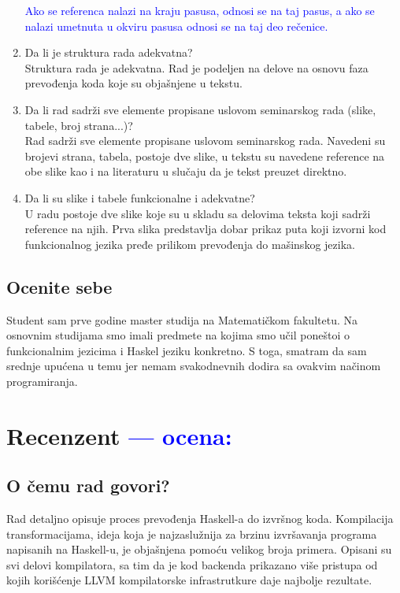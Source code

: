 \documentclass[a4paper]{report}
\newcommand{\odgovor}[1]{\textcolor{blue}{#1}}
\begin{document}
\begin{enumerate}
		\odgovor{Ako se referenca nalazi na kraju pasusa, odnosi se na taj pasus, a ako se nalazi umetnuta u okviru pasusa odnosi se na taj deo rečenice.}
		
		\item Da li je struktura rada adekvatna?\\
		Struktura rada je adekvatna. Rad je podeljen na delove na osnovu faza prevođenja koda koje su objašnjene u tekstu.
		\item Da li rad sadrži sve elemente propisane uslovom seminarskog rada (slike, tabele, broj strana...)?\\
		Rad sadrži sve elemente propisane uslovom seminarskog rada. Navedeni su brojevi strana, tabela, postoje dve slike, u tekstu su navedene reference na obe slike kao i na literaturu u slučaju da je tekst preuzet direktno.
		\item Da li su slike i tabele funkcionalne i adekvatne?\\
		U radu postoje dve slike koje su u skladu sa delovima teksta koji sadrži reference na njih. Prva slika predstavlja dobar prikaz puta koji izvorni kod funkcionalnog jezika pređe prilikom prevođenja do mašinskog jezika.
	\end{enumerate}
	
	\section{Ocenite sebe}
	Student sam prve godine master studija na Matematičkom fakultetu. Na osnovnim studijama smo imali predmete na kojima smo učil poneštoi o funkcionalnim jezicima i Haskel jeziku konkretno. S toga, smatram da sam srednje upućena u temu jer nemam svakodnevnih dodira sa ovakvim načinom programiranja.
	
	
	\chapter{Recenzent \odgovor{--- ocena:} }
	
	
	\section{O čemu rad govori?}
	Rad detaljno opisuje proces prevođenja Haskell-a do izvršnog koda. Kompilacija transformacijama, ideja koja je najzaslužnija za brzinu izvršavanja programa napisanih na Haskell-u, je objašnjena pomoću velikog broja primera. Opisani su svi delovi kompilatora, sa tim da je kod backenda prikazano više pristupa od kojih korišćenje LLVM kompilatorske infrastrutkure daje najbolje rezultate.
	
\end{document}
